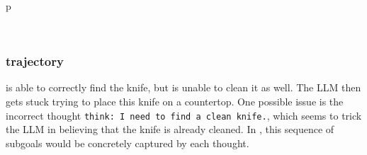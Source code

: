 \begin{table}[H]
\begin{minipage}{0.9\linewidth}
\begin{tabular}{p\linewidth}

\midrule \\

\end{tabular}
\end{minipage}%
\end{table}

\subsubsection{\modelim{} trajectory}
\label{appendix:reactim_ALFWorld_trajectory}

\modelim{} is able to correctly find the knife, but is unable to clean it as well. The LLM then gets stuck trying to place this knife on a countertop. One possible issue is the incorrect thought \texttt{think: I need to find a clean knife.}, which seems to trick the LLM in believing that the knife is already cleaned. In \model{}, this sequence of subgoals would be concretely captured by each thought.

